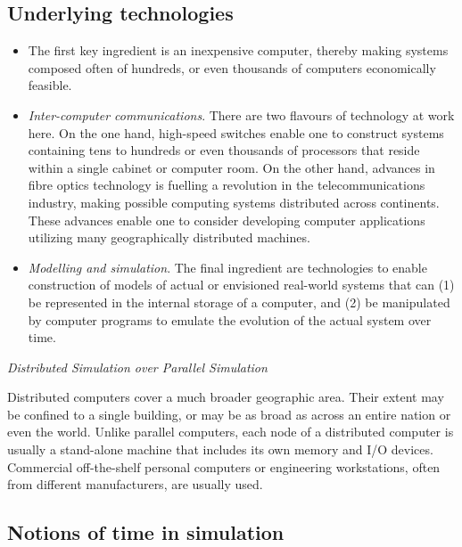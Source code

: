 \documentclass[12pt,a4paper]{article}
\begin{document}
	\subsection{Underlying technologies}
	
	\begin{itemize}
	\item The first key ingredient is an inexpensive computer, thereby making systems composed often of hundreds, or even thousands of computers economically feasible.
	\item \textit{Inter-computer communications}. There are two flavours of technology at work here. On the one hand, high-speed switches enable one to construct systems containing tens to hundreds or even thousands of processors that reside within a single cabinet or computer room. On the other hand, advances in fibre optics technology is fuelling a revolution in the telecommunications industry, making possible computing systems distributed across continents. These advances enable one to consider developing computer applications utilizing many geographically distributed machines.
	\item \textit{Modelling and simulation}. The final ingredient are technologies to enable construction of models of actual or envisioned real-world systems that can (1) be represented in the internal storage of a computer, and (2) be manipulated by computer programs to emulate the evolution of the actual system over time.
	\end{itemize}
	
	\emph{Distributed Simulation over Parallel Simulation}
	
	Distributed computers cover a much broader geographic area. Their extent may be confined to a single building, or may be as broad as across an entire nation or even the world. Unlike parallel computers, each node of a distributed computer is usually a stand-alone machine that includes its own memory and I/O devices. Commercial off-the-shelf personal computers or engineering workstations, often from different manufacturers, are usually used.
	
	\subsection{Notions of time in simulation}
	
\end{document}

